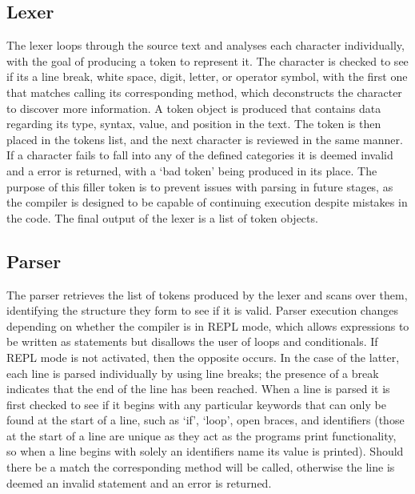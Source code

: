 \documentclass[
]{report}
\begin{document}
\subsection{Lexer}
The lexer loops through the source text and analyses each character
individually, with the goal of producing a token to represent it. The
character is checked to see if its a line break, white space, digit,
letter, or operator symbol, with the first one that matches calling its
corresponding method, which deconstructs the character to discover more
information. A token object is produced that contains data regarding its
type, syntax, value, and position in the text. The token is then placed
in the tokens list, and the next character is reviewed in the same
manner. If a character fails to fall into any of the defined categories
it is deemed invalid and a error is returned, with a `bad token' being
produced in its place. The purpose of this filler token is to prevent
issues with parsing in future stages, as the compiler is designed to be
capable of continuing execution despite mistakes in the code. The final
output of the lexer is a list of token objects.

\subsection{Parser}
The parser retrieves the list of tokens produced by the lexer and scans
over them, identifying the structure they form to see if it is valid.
Parser execution changes depending on whether the compiler is in REPL
mode, which allows expressions to be written as statements but disallows
the user of loops and conditionals. If REPL mode is not activated, then
the opposite occurs. In the case of the latter, each line is parsed
individually by using line breaks; the presence of a break indicates
that the end of the line has been reached. When a line is parsed it is
first checked to see if it begins with any particular keywords that can
only be found at the start of a line, such as `if', `loop', open braces,
and identifiers (those at the start of a line are unique as they act as
the programs print functionality, so when a line begins with solely an
identifiers name its value is printed). Should there be a match the
corresponding method will be called, otherwise the line is deemed an
invalid statement and an error is returned.
\end{document}
